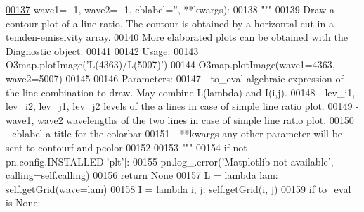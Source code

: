 \begin{DoxyCode}
\hypertarget{classpyneb_1_1core_1_1emis_grid_1_1_emis_grid_l00137}{}\hyperlink{classpyneb_1_1core_1_1emis_grid_1_1_emis_grid_acc7005176ce79eb13fdca3ff1607d6e8}{00137}                   wave1= -1, wave2= -1, cblabel=\textcolor{stringliteral}{''}, **kwargs):
00138         \textcolor{stringliteral}{"""}
00139 \textcolor{stringliteral}{        Draw a contour plot of a line ratio. The contour is obtained by a horizontal cut in a
       temden-emissivity array.}
00140 \textcolor{stringliteral}{        More elaborated plots can be obtained with the Diagnostic object.}
00141 \textcolor{stringliteral}{        }
00142 \textcolor{stringliteral}{        Usage:}
00143 \textcolor{stringliteral}{            O3map.plotImage('L(4363)/L(5007)')}
00144 \textcolor{stringliteral}{            O3map.plotImage(wave1=4363, wave2=5007)}
00145 \textcolor{stringliteral}{            }
00146 \textcolor{stringliteral}{        Parameters:}
00147 \textcolor{stringliteral}{            - to\_eval                         algebraic expression of the line combination to draw. May
       combine L(lambda) and I(i,j).}
00148 \textcolor{stringliteral}{            - lev\_i1, lev\_i2, lev\_j1, lev\_j2  levels of the a lines in case of simple line ratio plot.}
00149 \textcolor{stringliteral}{            - wave1, wave2                    wavelengths of the two lines in case of simple line ratio
       plot.}
00150 \textcolor{stringliteral}{            - cblabel                         a title for the colorbar}
00151 \textcolor{stringliteral}{            - **kwargs                        any other parameter will be sent to contourf and pcolor}
00152 \textcolor{stringliteral}{}
00153 \textcolor{stringliteral}{        """}
00154         \textcolor{keywordflow}{if} \textcolor{keywordflow}{not} pn.config.INSTALLED[\textcolor{stringliteral}{'plt'}]:
00155             pn.log\_.error(\textcolor{stringliteral}{'Matplotlib not available'}, calling=self.\hyperlink{classpyneb_1_1core_1_1emis_grid_1_1_emis_grid_a19820878261ee98513e0b755e688453f}{calling})
00156             \textcolor{keywordflow}{return} \textcolor{keywordtype}{None}
00157         L = \textcolor{keyword}{lambda} lam: self.\hyperlink{classpyneb_1_1core_1_1emis_grid_1_1_emis_grid_af9a9219e5ddfcfd53c52466e2c2deb44}{getGrid}(wave=lam)
00158         I = \textcolor{keyword}{lambda} i, j: self.\hyperlink{classpyneb_1_1core_1_1emis_grid_1_1_emis_grid_af9a9219e5ddfcfd53c52466e2c2deb44}{getGrid}(i, j)
00159         \textcolor{keywordflow}{if} to\_eval \textcolor{keywordflow}{is} \textcolor{keywordtype}{None}:

\end{DoxyCode}
